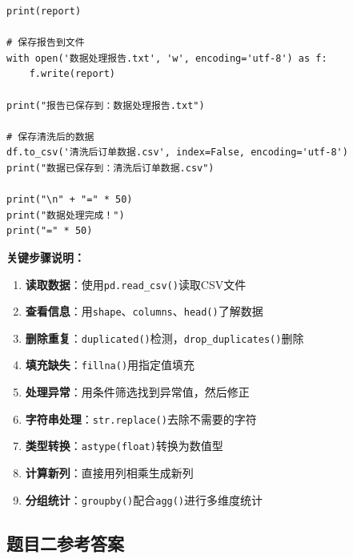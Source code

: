 \documentclass[12pt,a4paper]{article}
\begin{document}
\begin{practicebox}
\begin{lstlisting}[caption={电商订单数据处理完整解答}]
print(report)

# 保存报告到文件
with open('数据处理报告.txt', 'w', encoding='utf-8') as f:
    f.write(report)

print("报告已保存到：数据处理报告.txt")

# 保存清洗后的数据
df.to_csv('清洗后订单数据.csv', index=False, encoding='utf-8')
print("数据已保存到：清洗后订单数据.csv")

print("\n" + "=" * 50)
print("数据处理完成！")
print("=" * 50)
\end{lstlisting}

\textbf{关键步骤说明：}

\begin{enumerate}
    \item \textbf{读取数据}：使用\texttt{pd.read\_csv()}读取CSV文件
    \item \textbf{查看信息}：用\texttt{shape}、\texttt{columns}、\texttt{head()}了解数据
    \item \textbf{删除重复}：\texttt{duplicated()}检测，\texttt{drop\_duplicates()}删除
    \item \textbf{填充缺失}：\texttt{fillna()}用指定值填充
    \item \textbf{处理异常}：用条件筛选找到异常值，然后修正
    \item \textbf{字符串处理}：\texttt{str.replace()}去除不需要的字符
    \item \textbf{类型转换}：\texttt{astype(float)}转换为数值型
    \item \textbf{计算新列}：直接用列相乘生成新列
    \item \textbf{分组统计}：\texttt{groupby()}配合\texttt{agg()}进行多维度统计
\end{enumerate}
\end{practicebox}

\subsection{题目二参考答案}
\end{document}
